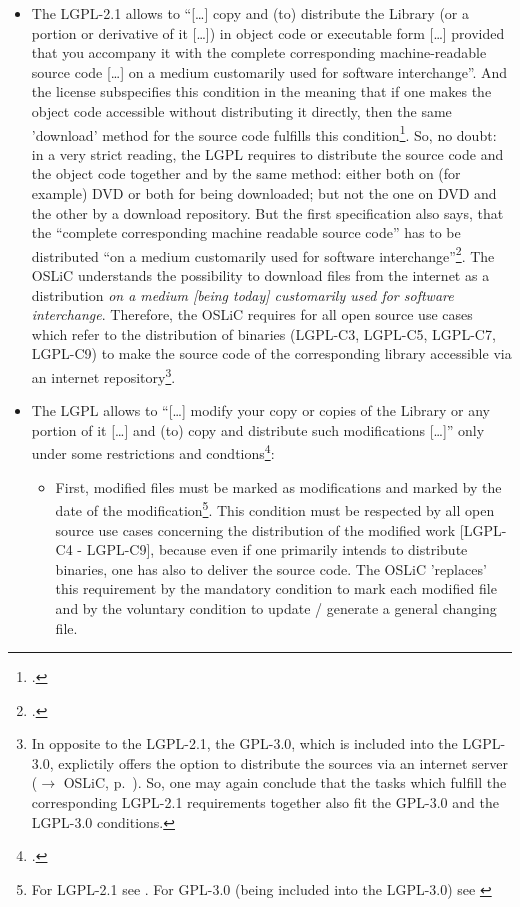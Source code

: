 \begin{itemize}
  \item The LGPL-2.1 allows to \enquote{[\ldots] copy and (to) distribute the
  Library (or a portion or derivative of it [\ldots]) in object code or
  executable form [\ldots] provided that you accompany it with the complete
  corresponding machine-readable source code [\ldots] on a medium customarily
  used for software interchange}. And the license subspecifies this condition in
  the meaning that if one makes the object code accessible without distributing
  it directly, then the same 'download' method for the source code fulfills this
  condition\footcite[cf.][\nopage wp.\ §4]{Lgpl21OsiLicense1999a}. So, no doubt:
  in a very strict reading, the LGPL requires to distribute the source code and
  the object code together and by the same method: either both on (for example)
  DVD or both for being downloaded; but not the one on DVD and the other by a
  download repository. But the first specification also says, that the
  \enquote{complete corresponding machine readable source code} has to be
  distributed \enquote{on a medium customarily used for software
  interchange}\footcite[cf.][\nopage wp.\ §4]{Lgpl21OsiLicense1999a}. The OSLiC
  understands the possibility to download files from the internet as a
  distribution \emph{on a medium [being today] customarily used for software
  interchange}. Therefore, the OSLiC requires for all open source use cases
  which refer to the distribution of binaries (LGPL-C3, LGPL-C5, LGPL-C7, LGPL-C9)
  to make the source code of the corresponding library accessible via an
  internet repository\footnote{In opposite to the LGPL-2.1, the GPL-3.0, which
  is included into the LGPL-3.0, explictily offers the option to distribute the
  sources via an internet server ($\rightarrow$ OSLiC, p.\
  \pageref{Gpl3CondCopyleft}). So, one may again conclude that the tasks
  which fulfill the corresponding LGPL-2.1 requirements together also fit the
  GPL-3.0 and the LGPL-3.0 conditions.}.
  
  \item The LGPL allows to \enquote{[\ldots] modify your copy or copies of
  the Library or any portion of it [\ldots] and (to) copy and distribute such
  modifications [\ldots]} only under some restrictions and
  condtions\footcite[cf.][\nopage wp.\ §2]{Lgpl21OsiLicense1999a}:
  \begin{itemize}
    \item First, modified files must be marked as modifications and marked by
    the date of the modification\footnote{For LGPL-2.1 see \cite[cf.][\nopage
    wp.\ §2]{Lgpl21OsiLicense1999a}. For GPL-3.0 (being included into the
    LGPL-3.0) see \cite[cf.][\nopage wp.\ §5]{Gpl30OsiLicense2007a}}. This
    condition must be respected by all open source use cases concerning the
    distribution of the modified work [LGPL-C4 - LGPL-C9], because even if one
    primarily intends to distribute binaries, one has also to deliver the source
    code. The OSLiC 'replaces' this requirement by the mandatory condition to
    mark each modified file and by the voluntary condition to update / generate
    a general changing file.
    

\end{itemize}
\end{itemize}
